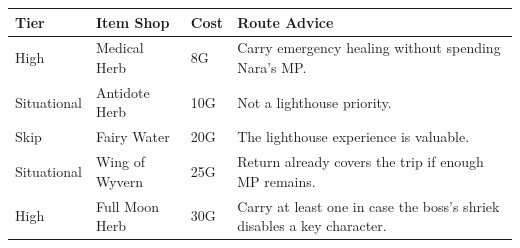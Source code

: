 \documentclass[
  american,
  10pt,
  letterpaper,
  oneside,
  open=any]{scrreprt}
\newcounter{none} %
\newenvironment{guidetable}{%
  \small\setstretch{1.0}%
  \setlength{\tabcolsep}{4pt}%
  \setlength{\LTpre}{8pt}\setlength{\LTpost}{10pt}%
  \renewcommand{\arraystretch}{1.16}%
}{ }
\begin{document}
\begin{guidetable}

{\def\LTcaptype{none} %
\begin{longtable}[]{@{}
  >{\raggedright\arraybackslash}p{}
  >{\raggedright\arraybackslash}p{}
  >{\raggedleft\arraybackslash}p{}
  >{\raggedright\arraybackslash}p{}@{}}
\toprule\noalign{}
\begin{minipage}[b]{\linewidth}\raggedright
\color{GuideGreen}\bfseries Tier
\end{minipage} & \begin{minipage}[b]{\linewidth}\raggedright
\color{GuideGreen}\bfseries Item Shop
\end{minipage} & \begin{minipage}[b]{\linewidth}\raggedleft
\color{GuideGreen}\bfseries Cost
\end{minipage} & \begin{minipage}[b]{\linewidth}\raggedright
\color{GuideGreen}\bfseries Route Advice
\end{minipage} \\
\midrule\noalign{}
\endhead
\bottomrule\noalign{}
\endlastfoot
High & Medical Herb & 8G & Carry emergency healing without spending
Nara's MP. \\
Situational & Antidote Herb & 10G & Not a lighthouse priority. \\
Skip & Fairy Water & 20G & The lighthouse experience is valuable. \\
Situational & Wing of Wyvern & 25G & Return already covers the trip if
enough MP remains. \\
High & Full Moon Herb & 30G & Carry at least one in case the boss's
shriek disables a key character. \\
\end{longtable}
}

\end{guidetable}
\end{document}
